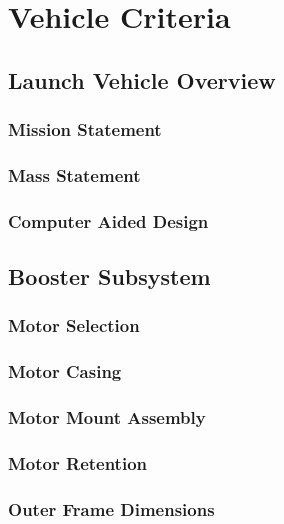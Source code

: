 \chapter{Vehicle Criteria}

\section{Launch Vehicle Overview}
    
    \subsection{Mission Statement}
    
    \subsection{Mass Statement}
    
    \subsection{Computer Aided Design}
    

\section{Booster Subsystem}

    \subsection{Motor Selection}

    \subsection{Motor Casing}


    \subsection{Motor Mount Assembly}


    \subsection{Motor Retention}


    \subsection{Outer Frame Dimensions}


